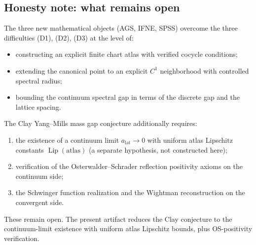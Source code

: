 \subsection{Honesty note: what remains open}
\label{ssec:open}

The three new mathematical objects (AGS, IFNE, SPSS) overcome the three
difficulties (D1), (D2), (D3) at the level of:
\begin{itemize}
\item constructing an explicit finite chart atlas with verified
  cocycle conditions;
\item extending the canonical point to an explicit $C^{1}$ neighborhood
  with controlled spectral radius;
\item bounding the continuum spectral gap in terms of the discrete gap
  and the lattice spacing.
\end{itemize}

The Clay Yang--Mills mass gap conjecture additionally requires:
\begin{enumerate}
\item the existence of a continuum limit $a_{\mathrm{lat}}\to 0$ with
  uniform atlas Lipschitz constants $\operatorname{Lip}(\mathrm{atlas})$
  (a separate hypothesis, not constructed here);
\item verification of the Osterwalder--Schrader reflection positivity
  axioms on the continuum side;
\item the Schwinger function realization and the Wightman reconstruction
  on the convergent side.
\end{enumerate}
These remain open. The present artifact reduces the Clay conjecture to
the continuum-limit existence with uniform atlas Lipschitz bounds, plus
OS-positivity verification.
\endinput
